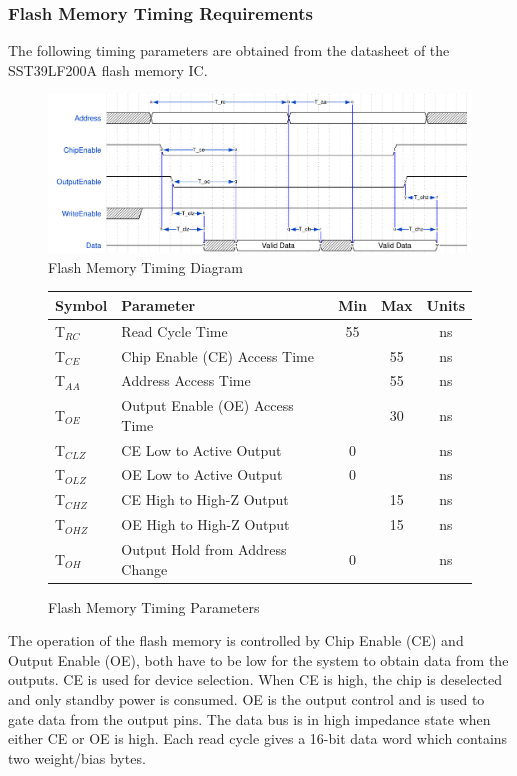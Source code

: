 \documentclass[12pt]{article}
\begin{document}
\subsubsection{Flash Memory Timing Requirements}
The following timing parameters are obtained from the datasheet of the SST39LF200A flash memory IC.\cite{flash}
\begin{figure}[H]
  \centering
  \includegraphics[width=\textwidth]{flash_timing.pdf}
  \caption{Flash Memory Timing Diagram}
\end{figure}

\begin{figure}[H]
  \centering
  \begin{tabular}[H]{|l|l|c|c|c|}
    \hline
    Symbol & Parameter & Min & Max & Units \\ \hline \hline
    T$_{RC}$ & Read Cycle Time & 55 & & ns \\\hline
    T$_{CE}$ & Chip Enable (CE) Access Time & & 55 & ns \\ \hline
    T$_{AA}$ & Address Access Time & & 55 & ns \\ \hline
    T$_{OE}$ & Output Enable (OE) Access Time & & 30 & ns \\ \hline
    T$_{CLZ}$ & CE Low to Active Output & 0  & & ns \\ \hline
    T$_{OLZ}$ & OE Low to Active Output & 0 & & ns \\ \hline
    T$_{CHZ}$ & CE High to High-Z Output & & 15 & ns \\ \hline
    T$_{OHZ}$ & OE High to High-Z Output & & 15 & ns \\ \hline
    T$_{OH}$ & Output Hold from Address Change & 0 & & ns \\ \hline
  \end{tabular}
  \caption{Flash Memory Timing Parameters}
\end{figure}
The operation of the flash memory is controlled by Chip Enable (CE) and Output Enable (OE), both have to be low for the system to obtain data from the outputs. CE is used for device selection. When CE is high, the chip is deselected and only standby power is consumed. OE is the output control and is used to gate data from the output pins. The data bus is in high impedance state when either CE or OE is high. Each read cycle gives a 16-bit data word which contains two weight/bias bytes.
\newpage
\end{document}
